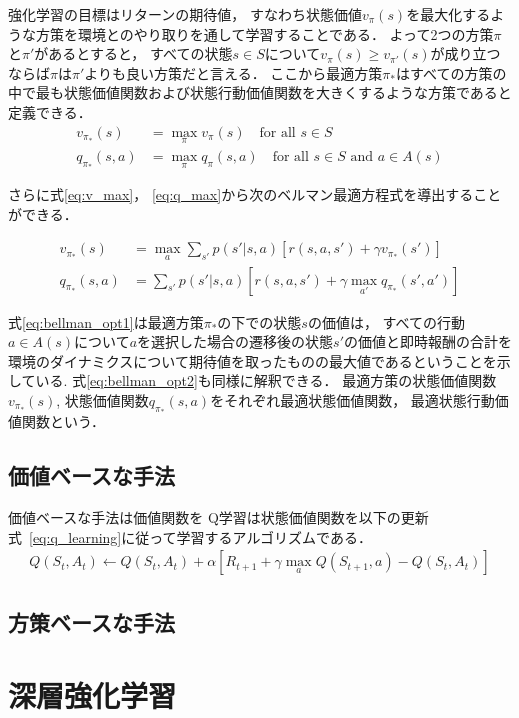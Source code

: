 強化学習の目標はリターンの期待値， すなわち状態価値$v_\pi(s)$を最大化するような方策を環境とのやり取りを通して学習することである．
よって2つの方策$\pi$と$\pi'$があるとすると， すべての状態$s \in S$について$v_\pi(s) \geq v_{\pi'}(s)$が成り立つならば$\pi$は$\pi'$よりも良い方策だと言える．
ここから最適方策$\pi_*$はすべての方策の中で最も状態価値関数および状態行動価値関数を大きくするような方策であると定義できる．
\begin{align}
  \label{eq:v_max}
  v_{\pi_*}(s) &= \max_\pi v_{\pi}(s) \quad \text{for all } s \in S \\
  \label{eq:q_max}
  q_{\pi_*}(s,a) &= \max_\pi q_{\pi}(s, a) \quad \text{for all } s \in S \text{ and } a \in A(s)
\end{align}

さらに式\ref{eq:v_max}， \ref{eq:q_max}から次のベルマン最適方程式を導出することができる．

\begin{align}
  \label{eq:bellman_opt1}
  v_{\pi_*}(s) &= \max_a \sum_{s'}p(s'|s,a)[r(s,a,s') + \gamma v_{\pi_*}(s')] \\
  \label{eq:bellman_opt2}
  q_{\pi_*}(s,a) &= \sum_{s'}p(s'|s,a)[r(s,a,s') +\gamma \max_{a'}q_{\pi_*}(s',a')]
\end{align}

式\ref{eq:bellman_opt1}は最適方策$\pi_*$の下での状態$s$の価値は， すべての行動$a \in A(s)$について$a$を選択した場合の遷移後の状態$s'$の価値と即時報酬の合計を環境のダイナミクスについて期待値を取ったものの最大値であるということを示している.
式\ref{eq:bellman_opt2}も同様に解釈できる．
最適方策の状態価値関数$v_{\pi_*}(s)$, 状態価値関数$q_{\pi_*}(s,a)$をそれぞれ最適状態価値関数， 最適状態行動価値関数という．

\subsection{価値ベースな手法}
価値ベースな手法は価値関数を
Q学習は状態価値関数を以下の更新式~\ref{eq:q_learning}に従って学習するアルゴリズムである．
\begin{align}
  \label{eq:q_learning}
  Q(S_t, A_t) \leftarrow Q(S_t, A_t) + \alpha [R_{t+1} + \gamma \max_a Q(S_{t+1}, a) - Q(S_t, A_t)]
\end{align}


\subsection{方策ベースな手法}

\section{深層強化学習}

